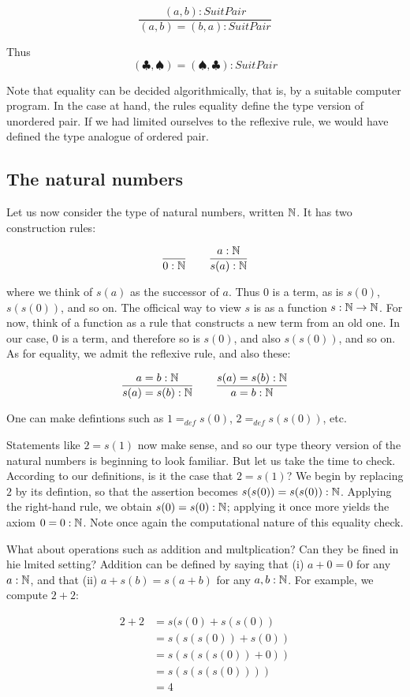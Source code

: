 $$
\frac{(a,b) : SuitPair }{(a,b) = (b,a) : SuitPair}
$$

Thus 
$$(\clubsuit, \spadesuit) = (\spadesuit, \clubsuit) : SuitPair
$$

Note that equality can be decided algorithmically, that is, by a suitable computer program.  In the case at hand, the rules equality define the type version of unordered pair.  If we had limited ourselves to the reflexive rule, we would have defined the type analogue of ordered pair.  

\subsection{The natural numbers}


Let us now consider the type of natural numbers, written $\mathbb{N}$.  It has two construction rules:

$$
\frac{}{0 : \mathbb{N} } \qquad \frac{a : \mathbb{N}}{s(a) : \mathbb{N}}
$$

where we think of $s(a)$ as the successor of $a$.  Thus $0$ is a term, as is $s(0)$, $s(s(0))$, and so on.  The officical way to view $s$ is as a function $s : \mathbb{N} \to \mathbb{N}$.  For now, think of a function as a rule that constructs a new term from an old one.  In our case, $0$ is a term, and therefore so is $s(0)$, and also $s(s(0))$, and so on.  As for equality, we admit the reflexive rule, and also these:

$$
\frac{a = b : \mathbb{N}}{s(a)  = s(b) : \mathbb{N}}
\qquad 
\frac{s(a)  = s(b) : \mathbb{N}}{a = b : \mathbb{N}}
$$

One can make defintions such as $1 =_{def}  s(0)$, $2 =_{def}  s(s(0))$, etc.  

Statements like $2 = s(1)$ now make sense, and so our type theory version of the natural numbers is beginning to look familiar.   But let us take the time to check.  According to our definitions, is it the case that $2 = s(1)$?  We begin by replacing $2$ by its defintion, so that the assertion becomes $s(s(0)) = s(s(0)): \mathbb{N}$.  Applying the right-hand rule, we obtain $s(0) = s(0): \mathbb{N}$; applying it once more yields the axiom $0 = 0 : \mathbb{N}$. Note once again the computational nature of this equality check.


What about operations such as addition and multplication?  Can they be fined in hie lmited setting?
Addition can be defined by saying that (i) $a + 0 = 0$ for any $a:\mathbb{N}$, and that (ii) $a + s(b) = s(a + b)$ for any $a,b:\mathbb{N}$.  For example, we compute $2 + 2$:

\begin{align}
2 + 2 &= s(s(0) + s(s(0))\\
  &= s(s(s(0)) + s(0)) \\
  &= s(s(s(s(0)) + 0)) \\
  &= s(s(s(s(0)))) \\
  &= 4
\end{align}


